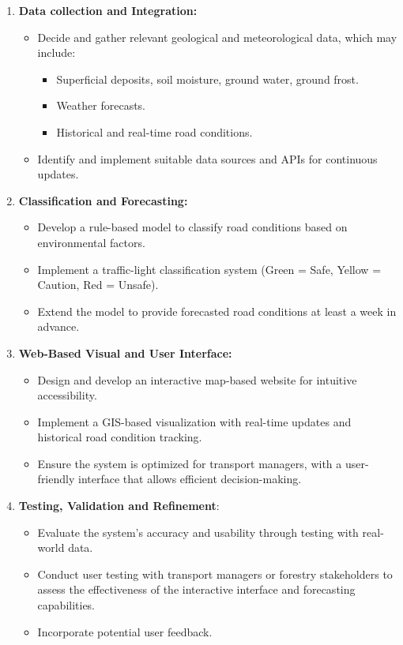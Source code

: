 \begin{enumerate}
    \item \textbf{Data collection and Integration:}
    \begin{itemize}
        \item Decide and gather relevant geological and meteorological data, which may include:
        \begin{itemize}
            \item Superficial deposits, soil moisture, ground water, ground frost.
            \item Weather forecasts.
            \item Historical and real-time road conditions.
        \end{itemize}
        \item Identify and implement suitable data sources and APIs for continuous updates.
    \end{itemize}
    
    \item \textbf{Classification and Forecasting:}
    \begin{itemize}
        \item Develop a rule-based model to classify road conditions based on environmental factors.  
        \item Implement a traffic-light classification system (Green = Safe, Yellow = Caution, Red = Unsafe).  
        \item Extend the model to provide forecasted road conditions at least a week in advance.  
    \end{itemize}
    
    \item \textbf{Web-Based Visual and User Interface:}
    \begin{itemize}
        \item Design and develop an interactive map-based website for intuitive accessibility.
        \item Implement a GIS-based visualization with real-time updates and historical road condition tracking. 
        \item Ensure the system is optimized for transport managers, with a user-friendly interface that allows efficient decision-making. 
    \end{itemize}
    
    \item \textbf{Testing, Validation and Refinement}:
    \begin{itemize}
        \item Evaluate the system’s accuracy and usability through testing with real-world data.
        \item Conduct user testing with transport managers or forestry stakeholders to assess the effectiveness of the interactive interface and forecasting capabilities.
        \item Incorporate potential user feedback.
    \end{itemize} 
    

\end{enumerate}

